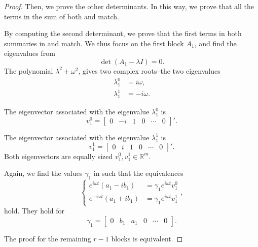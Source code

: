 \begin{proof}
Then, we prove the other determinants. In this way, we prove that all the terms in the sum of both  and  match. 

By computing the second determinant, we prove that the first terms in both summaries in  and  match. We thus focus on the first block $A_1$, and find the eigenvalues from 
\begin{equation}
  \det(A_1-\lambda I)=0.
\end{equation}
The polynomial $\lambda^2+\omega^2$, gives two complex roots--the two eigenvalues
\begin{subequations}\begin{align}
  \lambda_1^0&=i\omega,\\
  \lambda_1^1&=-i\omega.
\end{align}
\end{subequations}

The eigenvector associated with the eigenvalue $\lambda_1^0$ is 
\begin{equation}
  v_1^0=\begin{bmatrix}0 & -i&1&0&\cdots&0\end{bmatrix}'.  
\end{equation}

The eigenvector associated with the eigenvalue $\lambda_1^1$ is 
\begin{equation}
  v_1^1=\begin{bmatrix}0&i&1&0&\cdots&0\end{bmatrix}'. 
\end{equation}
Both eigenvectors are equally sized $v_1^0,v_1^1\in\mathbb{R}^m$.

Again, we find the values $\gamma_1$ in  such that the equivalences 
\begin{equation}\begin{cases}    
  e^{i\omega t}(a_1-ib_1)&=\gamma_1 e^{i\omega t}v_1^0\\
  e^{-i\omega t}(a_1+ib_1)&=\gamma_1 e^{i\omega t}v_1^1
\end{cases},\end{equation}
hold. They hold for 
\begin{equation}
  \gamma_1=\begin{bmatrix}0&b_1&a_1&0&\cdots&0\end{bmatrix}.
\end{equation} 

The proof for the remaining $r-1$ blocks is equivalent.


\end{proof}
